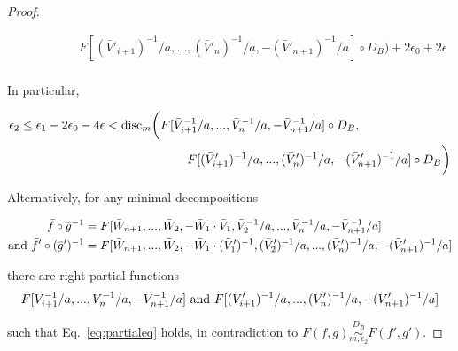 \documentclass{article} %
\newcommand{\disc}{\textnormal{disc}}
\begin{document}
\begin{proof}
\begin{small}
\begin{equation}
\begin{aligned}
&\;\;\;\;\;\;\;\;\;\;\;\;\;\;\;\; F[(\bar{V}'_{i+1})^{-1}/a,...,(\bar{V}'_n)^{-1}/a,-(\bar{V}'_{n+1})^{-1}/a] \circ D_B \bigg) + 2\epsilon_0+2\epsilon  \\
\end{aligned}
\end{equation}
\end{small}
In particular, 
\begin{small}
\begin{equation}\label{eq:partialeq}
\begin{aligned}
\epsilon_2 \leq \epsilon_1 - 2 \epsilon_0 - 4\epsilon &<  \disc_{m}\bigg(F[\bar{V}^{-1}_{i+1}/a,...,\bar{V}^{-1}_n/a,-\bar{V}^{-1}_{n+1}/a] \circ D_B, \\
&\;\;\;\;\;\;\;\;\;\;\;\;\;\;\;\;\;\;\;\;\;\;\;\; F[(\bar{V}'_{i+1})^{-1}/a,...,(\bar{V}'_n)^{-1}/a,-(\bar{V}'_{n+1})^{-1}/a] \circ D_B \bigg)
\end{aligned}
\end{equation}
\end{small}
Alternatively, for any minimal decompositions 
\begin{small}
\begin{equation}
\begin{aligned}
\bar{f} \circ \bar{g}^{-1} &= F[\bar{W}_{n+1},...,\bar{W}_2,-\bar{W}_1 \cdot \bar{V}_1,\bar{V}^{-1}_2/a,...,\bar{V}^{-1}_n/a,-\bar{V}^{-1}_{n+1}/a]\\
\textnormal{and }
\bar{f}' \circ (\bar{g}')^{-1} &= F[\bar{W}_{n+1},...,\bar{W}_2,-\bar{W}_1 \cdot(\bar{V}'_1)^{-1},(\bar{V}'_2)^{-1}/a,...,(\bar{V}'_n)^{-1}/a,-(\bar{V}'_{n+1})^{-1}/a]
\end{aligned}
\end{equation}
\end{small}
there are right partial functions 
\begin{equation}
F[\bar{V}^{-1}_{i+1}/a,...,\bar{V}^{-1}_n/a,-\bar{V}^{-1}_{n+1}/a] 
\textnormal{ and } 
F[(\bar{V}'_{i+1})^{-1}/a,...,(\bar{V}'_n)^{-1}/a,-(\bar{V}'_{n+1})^{-1}/a]
\end{equation}

such that Eq.~\ref{eq:partialeq} holds, in contradiction to $F(f,g) \overset{D_B}{\underset{m,\epsilon_2}{\sim}}  F(f',g')$. 



\end{proof}
\end{document}
